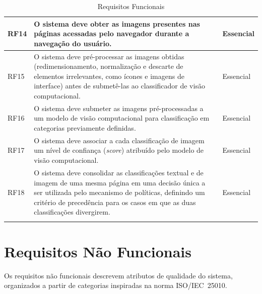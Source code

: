 \documentclass[
    12pt,           %
    oneside,        %
    a4paper,        %
    chapter=TITLE,  %
    english,        %
    brazil          %
]{abntex2}
\begin{document}
\begin{longtable}{|p{1.6cm}|p{9.8cm}|p{2.3cm}|}
RF14 & O sistema deve obter as imagens presentes nas páginas acessadas pelo navegador durante a navegação do usuário. & Essencial \\ \hline
RF15 & O sistema deve pré-processar as imagens obtidas (redimensionamento, normalização e descarte de elementos irrelevantes, como ícones e imagens de interface) antes de submetê-las ao classificador de visão computacional. & Essencial \\ \hline
RF16 & O sistema deve submeter as imagens pré-processadas a um modelo de visão computacional para classificação em categorias previamente definidas. & Essencial \\ \hline
RF17 & O sistema deve associar a cada classificação de imagem um nível de confiança (\textit{score}) atribuído pelo modelo de visão computacional. & Essencial \\ \hline
RF18 & O sistema deve consolidar as classificações textual e de imagem de uma mesma página em uma decisão única a ser utilizada pelo mecanismo de políticas, definindo um critério de precedência para os casos em que as duas classificações divergirem. & Essencial \\ \hline

\caption{Requisitos Funcionais}
\label{tab:requisitos-funcionais}
\end{longtable}

\section{Requisitos Não Funcionais}

Os requisitos não funcionais descrevem atributos de qualidade do sistema,
organizados a partir de categorias inspiradas na norma ISO/IEC~25010.
\end{document}
